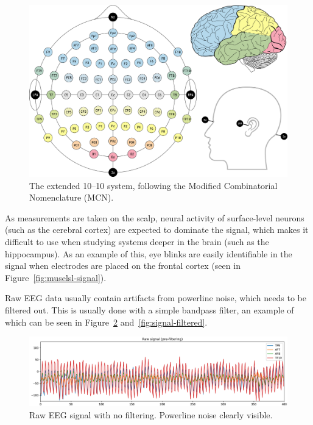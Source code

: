     \begin{landscape}
        \begin{figure}
            \begin{center}
                \includegraphics[width=20cm]{img/1020system-extended-with-extra-info.png}
            \end{center}
            \caption{The extended 10–10 system, following the Modified Combinatorial Nomenclature (MCN).}\label{fig:1010}
        \end{figure}
    \end{landscape}

    As measurements are taken on the scalp, neural activity of surface-level neurons (such as the cerebral cortex) are expected to dominate the signal, which makes it difficult to use when studying systems deeper in the brain (such as the hippocampus). As an example of this, eye blinks are easily identifiable in the signal when electrodes are placed on the frontal cortex (seen in Figure~\ref{fig:muselsl-signal}).


    Raw EEG data usually contain artifacts from powerline noise, which needs to be filtered out. This is usually done with a simple bandpass filter, an example of which can be seen in Figure~\ref{fig:signal-unfiltered} and~\ref{fig:signal-filtered}.
    
    \begin{figure}[H]
        \includegraphics[width=14cm]{img/raw-signal-prefilter.png}
        \caption{Raw EEG signal with no filtering. Powerline noise clearly visible.}\label{fig:signal-unfiltered}
    \end{figure}


